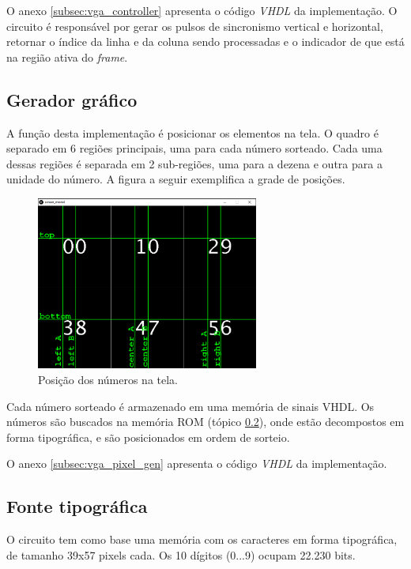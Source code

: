 \documentclass[12pt]{article}
\begin{document}
O anexo \ref{subsec:vga_controller} apresenta o código \emph{VHDL} da implementação. O circuito é responsável por gerar os pulsos de sincronismo vertical e horizontal, retornar o índice da linha e da coluna sendo processadas e o indicador de que está na região ativa do \emph{frame}.

\subsection{Gerador gráfico}
\label{subsec:graphic-gen}
A função desta implementação é posicionar os elementos na tela. O quadro é separado em 6 regiões principais, uma para cada número sorteado. Cada uma dessas regiões é separada em 2 sub-regiões, uma para a dezena e outra para a unidade do número. A figura a seguir exemplifica a grade de posições.

\clearpage

\begin{figure}[!h]
    \centering
    \includegraphics[width=0.65\textwidth]{img/pontos-tela.png}
    \caption{Posição dos números na tela.}
\end{figure}

Cada número sorteado é armazenado em uma memória de sinais VHDL. Os números são buscados na memória ROM (tópico \ref{subsec:font-rom}), onde estão decompostos em forma tipográfica, e são posicionados em ordem de sorteio.

O anexo \ref{subsec:vga_pixel_gen} apresenta o código \emph{VHDL} da implementação.


\subsection{Fonte tipográfica}
\label{subsec:font-rom}
O circuito tem como base uma memória com os caracteres em forma tipográfica, de tamanho 39x57 pixels cada. Os 10 dígitos (0...9) ocupam 22.230 bits.
\end{document}
